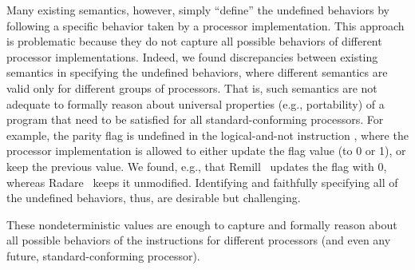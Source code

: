 Many existing semantics, however, simply ``define'' the undefined behaviors by
following a specific behavior taken by a processor implementation.
This approach is problematic because they do not capture all possible behaviors of different processor implementations.
Indeed, we found discrepancies between existing semantics in specifying the undefined behaviors, where different semantics are valid only for different groups of processors.
That is, such semantics are not adequate to formally reason about universal properties (e.g., portability) of a program that need to be satisfied for all standard-conforming processors.
%
For example, the parity flag  is undefined in the logical-and-not instruction , where the processor implementation is allowed to either update the flag value (to 0 or 1), or keep the previous value.
We found, e.g., that Remill~\cite{Remill} updates the flag with 0, whereas Radare~\cite{Radare2} keeps it unmodified.
%
Identifying and faithfully specifying all of the undefined behaviors, thus, are desirable but challenging.

These nondeterministic values are enough to capture and formally reason about all possible behaviors of the instructions for different processors (and even any future, standard-conforming processor).






%









